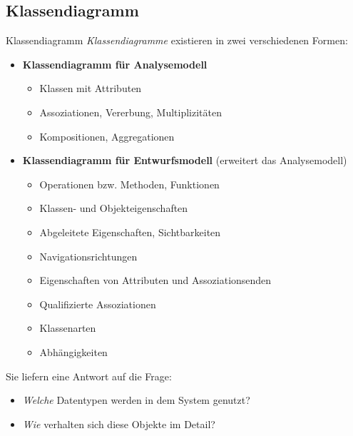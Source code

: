 \subsection{Klassendiagramm}

\begin{defi}{Klassendiagramm}
    \emph{Klassendiagramme} existieren in zwei verschiedenen Formen:

    \begin{itemize}
        \item \textbf{Klassendiagramm für Analysemodell}
              \begin{itemize}
                  \item Klassen mit Attributen
                  \item Assoziationen, Vererbung,  Multiplizitäten
                  \item Kompositionen, Aggregationen
              \end{itemize}
        \item \textbf{Klassendiagramm für Entwurfsmodell} (erweitert das Analysemodell)
              \begin{itemize}
                  \item Operationen bzw. Methoden, Funktionen
                  \item Klassen- und Objekteigenschaften
                  \item Abgeleitete Eigenschaften, Sichtbarkeiten
                  \item Navigationsrichtungen
                  \item Eigenschaften von Attributen und Assoziationsenden
                  \item Qualifizierte Assoziationen
                  \item Klassenarten
                  \item Abhängigkeiten
              \end{itemize}
    \end{itemize}

    Sie liefern eine Antwort auf die Frage:
    \begin{itemize}
        \item \emph{Welche} Datentypen werden in dem System genutzt?
        \item \emph{Wie} verhalten sich diese Objekte im Detail?
    \end{itemize}
\end{defi}


